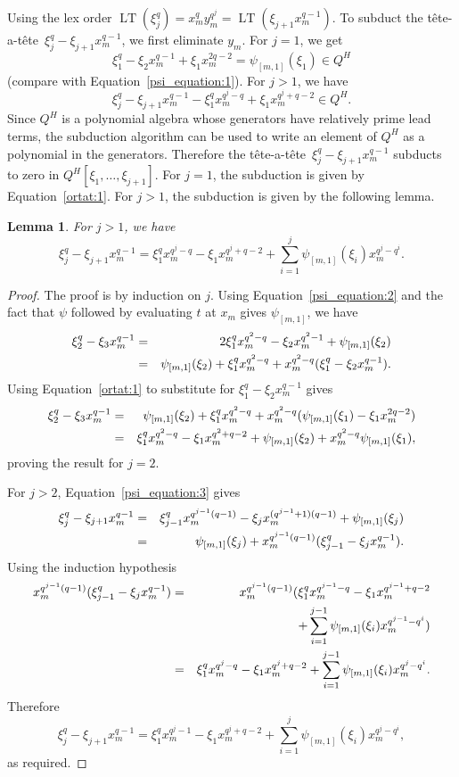 \documentclass{amsart}
\newcommand{\tat}{t\^ete-a-t\^ete}
\newtheorem{lem}[subsection]{Lemma}
\DeclareMathOperator{\lt}{LT}
\begin{document}
Using the lex order $\lt(\xi_j^q)=x_m^qy_m^{q^j}=\lt(\xi_{j+1}x_m^{q-1})$.
To subduct the \tat\ $\xi_j^q-\xi_{j+1}x_m^{q-1}$, we first eliminate $y_m$.
For $j=1$, we get
\begin{equation}\label{ortat:1}
  \xi_1^q-\xi_2x_m^{q-1}+\xi_1x_m^{2q-2}=\psi_{[m,1]}(\xi_1)\in Q^H
  \end{equation}
  (compare with Equation~\ref{psi_equation:1}).
  For $j>1$, we have
$$\xi_{j}^q-\xi_{j+1}x_m^{q-1}-\xi_1^qx_m^{q^j-q}+\xi_1x_m^{q^j+q-2}\in Q^H.$$
Since $Q^H$ is a polynomial algebra whose generators have relatively prime lead terms,
the subduction algorithm can be used to write an element of $Q^H$ as a polynomial in the generators. Therefore the \tat\ $\xi_{j}^q-\xi_{j+1}x_m^{q-1}$ subducts to zero in
$Q^H[\xi_1,\ldots,\xi_{j+1}]$. For $j=1$, the subduction is given by Equation~\ref{ortat:1}. For $j>1$, the subduction is given by the following lemma.

\begin{lem} \label{ortat:2} For $j>1$, we have
$$\xi_{j}^q-\xi_{j+1}x_m^{q-1}=\xi_1^qx_m^{q^j-q}-\xi_1x_m^{q^j+q-2}
+\sum_{i=1}^j\psi_{[m,1]}(\xi_i)x_m^{q^j-q^i}.$$
\end{lem}
\begin{proof} The proof is by induction on $j$.
Using Equation~\ref{psi_equation:2}
 and the fact that $\psi$ followed by evaluating $t$ at $x_m$ gives $\psi_{[m,1]}$, 
 we have
 \begin{eqnarray*} 
 \xi_{2}^q-\xi_{3}x_m^{q-1}
 &=&2\xi_1^qx_m^{q^2-q} -\xi_2x_m^{q^{2}-1}+\psi_{[m,1]}(\xi_{2})\cr
 &=&\psi_{[m,1]}(\xi_{2})+\xi_1^qx_m^{q^2-q}
 +x_m^{q^2-q}(\xi_1^q-\xi_2 x_m^{q-1}).
 \end{eqnarray*}
 Using Equation~\ref{ortat:1} to substitute for $\xi_1^q-\xi_2 x_m^{q-1}$
 gives
 \begin{eqnarray*} \xi_{2}^q-\xi_{3}x_m^{q-1}&=&\psi_{[m,1]}(\xi_{2})+\xi_1^qx_m^{q^2-q}
 +x_m^{q^2-q}(\psi_{[m,1]}(\xi_1)-\xi_1x_m^{2q-2})\cr
 &=&\xi_1^qx_m^{q^2-q}-\xi_1 x_m^{q^2+q-2}+\psi_{[m,1]}(\xi_{2})
 +x_m^{q^2-q}\psi_{[m,1]}(\xi_1),
 \end{eqnarray*} 
 proving the result for $j=2$.

For $j>2$, Equation~\ref{psi_equation:3} gives
\begin{eqnarray*} 
 \xi_{j}^q-\xi_{j+1}x_m^{q-1}&=&\xi_{j-1}^qx_m^{q^{j-1}(q-1)}
 -\xi_jx_m^{(q^{j-1}+1)(q-1)}+\psi_{[m,1]}(\xi_{j})\cr
 &=&\psi_{[m,1]}(\xi_{j})
 +x_m^{q^{j-1}(q-1)}(\xi_{j-1}^q-\xi_jx_m^{q-1}).
 \end{eqnarray*}  
 Using the induction hypothesis
 \begin{eqnarray*}
 x_m^{q^{j-1}(q-1)}(\xi_{j-1}^q-\xi_jx_m^{q-1})
 &=&x_m^{q^{j-1}(q-1)}(\xi_1^q x_m^{q^{j-1}-q}
 -\xi_1x_m^{q^{j-1}+q-2} \cr
 &&+\sum_{i=1}^{j-1}\psi_{[m,1]}(\xi_i)x_m^{q^{j-1}-q^i})\cr
&=&\xi_1^qx_m^{q^j-q}-\xi_1x_m^{q^j+q-2}
+\sum_{i=1}^{j-1}\psi_{[m,1]}(\xi_i)x_m^{q^j-q^i}.
\end{eqnarray*}
Therefore
$$\xi_{j}^q-\xi_{j+1}x_m^{q-1}=\xi_1^qx_m^{q^j-1}-\xi_1x_m^{q^j+q-2}
+\sum_{i=1}^j\psi_{[m,1]}(\xi_i)x_m^{q^j-q^i},$$
as required.
\end{proof}
\end{document}

